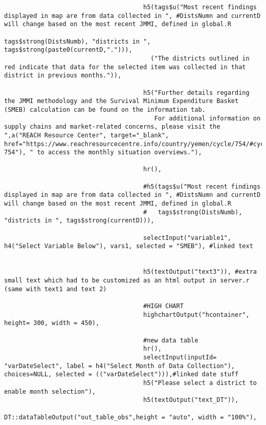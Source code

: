 \documentclass[
]{article}
\begin{document}
\begin{verbatim}
                                      h5(tags$u("Most recent findings displayed in map are from data collected in ", #DistsNumn and currentD will change based on the most recent JMMI, defined in global.R
                                                tags$strong(DistsNumb), "districts in ", tags$strong(paste0(currentD,"."))),
                                        ("The districts outlined in red indicate that data for the selected item was collected in that district in previous months.")),
                                      
                                      h5("Further details regarding the JMMI methodology and the Survival Minimum Expenditure Basket (SMEB) calculation can be found on the information tab. 
                                         For additional information on supply chains and market-related concerns, please visit the  ",a("REACH Resource Center", target="_blank",    href="https://www.reachresourcecentre.info/country/yemen/cycle/754/#cycle-754"), " to access the monthly situation overviews."),
                                      
                                      hr(),
                                      
                                      #h5(tags$u("Most recent findings displayed in map are from data collected in ", #DistsNumn and currentD will change based on the most recent JMMI, defined in global.R
                                      #   tags$strong(DistsNumb), "districts in ", tags$strong(currentD))),
                                      
                                      selectInput("variable1", h4("Select Variable Below"), vars1, selected = "SMEB"), #linked text
                                      
                                    
                                      h5(textOutput("text3")), #extra small text which had to be customized as an html output in server.r (same with text1 and text 2)
                                      
                                      #HIGH CHART
                                      highchartOutput("hcontainer", height= 300, width = 450),
                                      
                                      #new data table 
                                      hr(),
                                      selectInput(inputId= "varDateSelect", label = h4("Select Month of Data Collection"), choices=NULL, selected = (("varDateSelect"))),#linked date stuff
                                      h5("Please select a district to enable month selection"),
                                      h5(textOutput("text_DT")),
                                      DT::dataTableOutput("out_table_obs",height = "auto", width = "100%"),
                                      

\end{verbatim}
\end{document}
